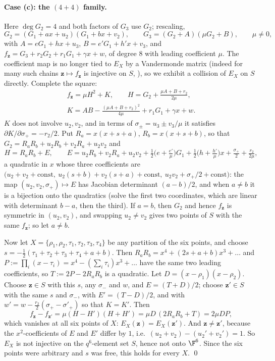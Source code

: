 \paragraph{Case (c): the $(4{+}4)$ family.}
Here $\deg G_2=4$ and both factors of $G_3$ use $G_2$; rescaling,
\[
   G_2=(G_1+ax+u_2)(G_1+bx+v_2),\qquad
   G_3=(G_2+A)(\mu G_2+B),\qquad \mu\neq0,
\]
with $A=eG_1+hx+u_3$, $B=e'G_1+h'x+v_3$, and $f_{\mathbf z}=G_3+r_2G_2+r_1G_1+\gamma x+w$,
of degree $8$ with leading coefficient $\mu$.  The coefficient map is no longer tied to
$E_X$ by a Vandermonde matrix (indeed for many such chains $\mathbf z\mapsto f_{\mathbf z}$
is injective on $S$, ), so we exhibit a collision of $E_X$
on $S$ directly.  Complete the square:
\begin{gather*}
   f_{\mathbf z}=\mu H^2+K,\qquad
   H=G_2+\frac{\mu A+B+r_2}{2\mu},\\
   K=AB-\frac{(\mu A+B+r_2)^2}{4\mu}+r_1G_1+\gamma x+w .
\end{gather*}
$K$ does not involve $u_2,v_2$, and in terms of $\sigma_\pm=u_3\pm v_3/\mu$ it satisfies
$\partial K/\partial\sigma_+=-r_2/2$.  Put $R_a=x(x+s+a)$, $R_b=x(x+s+b)$, so that
$G_2=R_aR_b+u_2R_b+v_2R_a+u_2v_2$ and
\[
   H=R_aR_b+E,\qquad
   E=u_2R_b+v_2R_a+u_2v_2+\tfrac12\bigl(e+\tfrac{e'}{\mu}\bigr)G_1+\tfrac12\bigl(h+\tfrac{h'}{\mu}\bigr)x+\tfrac{\sigma_+}{2}+\tfrac{r_2}{2\mu},
\]
a quadratic in $x$ whose three coefficients are $\bigl(u_2+v_2+\text{const},\
u_2(s+b)+v_2(s+a)+\text{const},\ u_2v_2+\sigma_+/2+\text{const}\bigr)$: the map
$(u_2,v_2,\sigma_+)\mapsto E$ has Jacobian determinant $(a-b)/2$, and when $a\neq b$ it is
a bijection onto the quadratics (solve the first two coordinates, which are linear with
determinant $b-a$, then the third).  If $a=b$, then $G_2$ and hence $f_{\mathbf z}$ is
symmetric in $(u_2,v_2)$, and swapping $u_2\neq v_2$ gives two points of $S$ with the same
$f_{\mathbf z}$; so let $a\neq b$.

Now let $X=\{\rho_1,\rho_2,\tau_1,\tau_2,\tau_3,\tau_4\}$ be any partition of the six
points, and choose $s=-\tfrac12(\tau_1+\tau_2+\tau_3+\tau_4+a+b)$.  Then
$R_aR_b=x^4+(2s+a+b)x^3+\dots$ and $P:=\prod_i(x-\tau_i)=x^4-(\sum_i\tau_i)x^3+\dots$ have
the same two leading coefficients, so $T:=2P-2R_aR_b$ is a quadratic.  Let
$D=(x-\rho_1)(x-\rho_2)$.  Choose $\mathbf z\in S$ with this $s$, any $\sigma_-$ and $w$,
and $E=(T+D)/2$; choose $\mathbf z'\in S$ with the same $s$ and $\sigma_-$, with
$E'=(T-D)/2$, and with $w'=w-\tfrac{r_2}2(\sigma_+-\sigma'_+)$ so that $K=K'$.  Then
\[
   f_{\mathbf z}-f_{\mathbf z'}=\mu(H-H')(H+H')=\mu D\,(2R_aR_b+T)=2\mu DP,
\]
which vanishes at all six points of $X$: $E_X(\mathbf z)=E_X(\mathbf z')$.  And
$\mathbf z\neq\mathbf z'$, because the $x^2$-coefficients of $E$ and $E'$ differ by $1$,
i.e.\ $(u_2+v_2)-(u_2'+v_2')=1$.  So $E_X$ is not injective on the $q^6$-element set $S$,
hence not onto $\F^6$.  Since the six points were arbitrary and $s$ was free, this holds
for every $X$.  \qed

